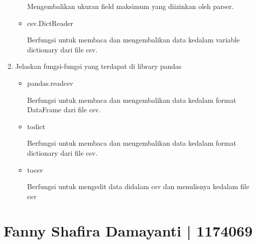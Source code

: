 \begin{enumerate}
\begin{itemize}
	Mengembalikan ukuran field maksimum yang diizinkan oleh parser.
	
	\item csv.DictReader
	
	Berfungsi untuk membaca dan mengembalikan data kedalam variable dictionary dari file csv.
	
	
\end{itemize}

\item Jelaskan fungsi-fungsi yang terdapat di library pandas
\begin{itemize}
	\item pandas.read\textunderscore csv
	
	Berfungsi untuk membaca dan mengembalikan data kedalam format DataFrame dari file csv.
	
	
	\item to\textunderscore dict
	
	Berfungsi untuk membaca dan mengembalikan data kedalam format dictionary dari file csv.
	
	
	\item to\textunderscore csv
	
	Berfungsi untuk mengedit data didalam csv dan menulisnya kedalam file csv
	
\end{itemize}
\end{enumerate}

\section{Fanny Shafira Damayanti | 1174069}
